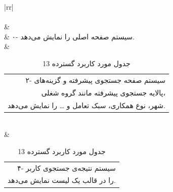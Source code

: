 \documentclass[12pt]{article}
\begin{document}
\begin{center}
	\begin{table}[H]
		\caption{جدول مورد کاربرد گسترده 13}
		\label{tab:ext-uc13}
		\begin{tabular}{|rr|}
			\hline
			                                                                                                                                                                                                                                           \\ \hline
			                                                                                                                                                                                                                                                                             \\ \hline
			                                                                                           &                                                                                                                               \\ \hline
			                                                                                                       & ۰- سیستم صفحه اصلی را نمایش می‌دهد.                                                                                                                                           \\ \hline
			  & \begin{tabular}[c]{@{}r@{}}۲- سیستم صفحه جستجوی پیشرفته و گزینه‌های\\  پالایه جستجوی پیشرفته مانند گروه شغلی،\\  شهر، نوع همکاری، سبک تعامل و … را نمایش می‌دهد.\end{tabular} \\ \hline
			 & \begin{tabular}[c]{@{}r@{}}۴- سیستم نتیجه‌ی جستجوی کاربر\\  را در قالب یک لیست نمایش می‌دهد.\end{tabular}                                                                     \\ \hline

\end{tabular}
\end{table}
\end{center}
\end{document}

